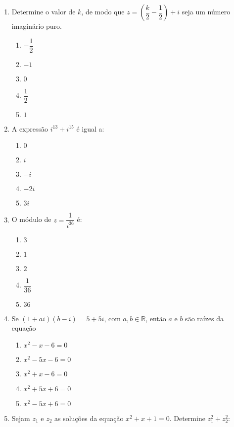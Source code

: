 \documentclass[11pt,a4paper]{article}
\begin{document}
\begin{enumerate}

\item Determine o valor de $k$, de modo que $z=\left(\dfrac{k}{2}-\dfrac{1}{2} \right) + i$ seja um número imaginário puro.

\begin{enumerate}
\item $-\dfrac{1}{2}$
\item $-1$
\item $0$
\item $\dfrac{1}{2}$
\item $1$
\end{enumerate}

\item A expressão $i^{13} + i^{15}$ é igual a:

\begin{enumerate}
	\item $0$ %
	\item $i$
	\item $-i$
	\item $-2i$
	\item $3i$
\end{enumerate}
\item O módulo de $z = \dfrac{1}{i^{36}}$ é:

\begin{enumerate}
	\item $3$
	\item $1$ %
	\item $2$
	\item $\dfrac{1}{36}$
	\item $36$
\end{enumerate}
\item Se $(1+ai)(b-i) = 5+5i$, com $a,b \in \mathbb{R}$, então $a$ e $b$ são raízes da equação

\begin{enumerate}
	\item $x^2-x-6=0$
	\item $x^2-5x-6=0$
	\item $x^2+x-6=0$
	\item $x^2+5x+6=0$
	\item $x^2-5x+6=0$ %
\end{enumerate}
\item Sejam $z_1$ e $z_2$ as soluções da equação $x^2+x+1=0$. Determine $z_1^2+z_2^2$:


\end{enumerate}
\end{document}
